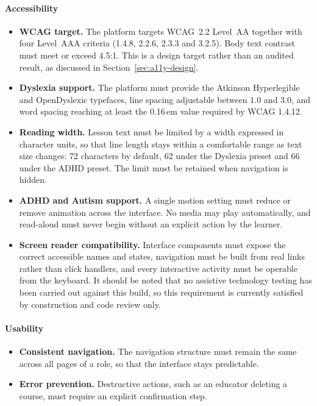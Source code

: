 \documentclass[12pt, oneside]{article} %
\begin{document}
\paragraph{Accessibility}
\begin{itemize}
    \item \textbf{WCAG target.} The platform targets WCAG~2.2 Level~AA \cite{wcag22} together with four Level~AAA criteria (1.4.8, 2.2.6, 2.3.3 and 3.2.5). Body text contrast must meet or exceed 4.5:1. This is a design target rather than an audited result, as discussed in Section~\ref{sec:a11y-design}.
    \item \textbf{Dyslexia support.} The platform must provide the Atkinson Hyperlegible \cite{atkinson2021atkinson} and OpenDyslexic \cite{opendyslexic} typefaces, line spacing adjustable between 1.0 and 3.0, and word spacing reaching at least the 0.16\,em value required by WCAG 1.4.12.
    \item \textbf{Reading width.} Lesson text must be limited by a width expressed in character units, so that line length stays within a comfortable range as text size changes: 72 characters by default, 62 under the Dyslexia preset and 66 under the ADHD preset. The limit must be retained when navigation is hidden.
    \item \textbf{ADHD and Autism support.} A single motion setting must reduce or remove animation across the interface. No media may play automatically, and read-aloud must never begin without an explicit action by the learner.
    \item \textbf{Screen reader compatibility.} Interface components must expose the correct accessible names and states, navigation must be built from real links rather than click handlers, and every interactive activity must be operable from the keyboard. It should be noted that no assistive technology testing has been carried out against this build, so this requirement is currently satisfied by construction and code review only.
\end{itemize}

\paragraph{Usability}
\begin{itemize}
    \item \textbf{Consistent navigation.} The navigation structure must remain the same across all pages of a role, so that the interface stays predictable.
    \item \textbf{Error prevention.} Destructive actions, such as an educator deleting a course, must require an explicit confirmation step.
\end{itemize}
\end{document}
